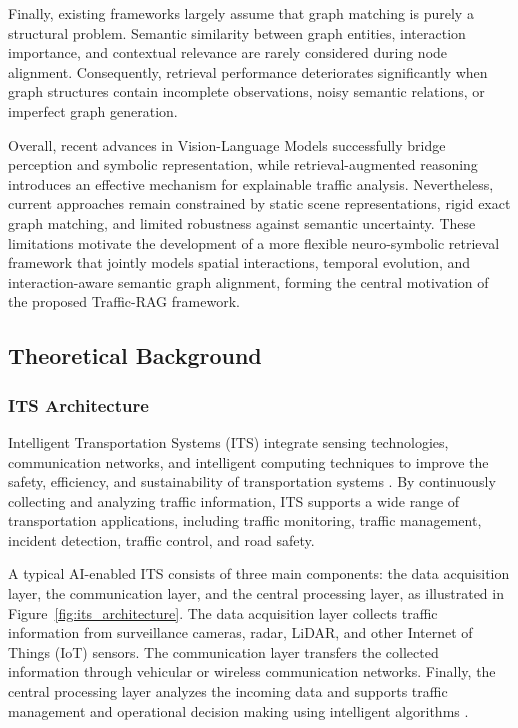 \documentclass[a4paper, 11pt]{article} %
\begin{document}
Finally, existing frameworks largely assume that graph matching is purely a structural problem. Semantic similarity between graph entities, interaction importance, and contextual relevance are rarely considered during node alignment. Consequently, retrieval performance deteriorates significantly when graph structures contain incomplete observations, noisy semantic relations, or imperfect graph generation.

Overall, recent advances in Vision-Language Models successfully bridge perception and symbolic representation, while retrieval-augmented reasoning introduces an effective mechanism for explainable traffic analysis. Nevertheless, current approaches remain constrained by static scene representations, rigid exact graph matching, and limited robustness against semantic uncertainty. These limitations motivate the development of a more flexible neuro-symbolic retrieval framework that jointly models spatial interactions, temporal evolution, and interaction-aware semantic graph alignment, forming the central motivation of the proposed Traffic-RAG framework.
\subsection{Theoretical Background}
\subsubsection{ITS Architecture}

Intelligent Transportation Systems (ITS) integrate sensing technologies, communication networks, and intelligent computing techniques to improve the safety, efficiency, and sustainability of transportation systems \cite{hassan2021intelligent}. By continuously collecting and analyzing traffic information, ITS supports a wide range of transportation applications, including traffic monitoring, traffic management, incident detection, traffic control, and road safety.

A typical AI-enabled ITS consists of three main components: the data acquisition layer, the communication layer, and the central processing layer, as illustrated in Figure~\ref{fig:its_architecture}. The data acquisition layer collects traffic information from surveillance cameras, radar, LiDAR, and other Internet of Things (IoT) sensors. The communication layer transfers the collected information through vehicular or wireless communication networks. Finally, the central processing layer analyzes the incoming data and supports traffic management and operational decision making using intelligent algorithms \cite{elassy2024intelligent}.
\end{document}
